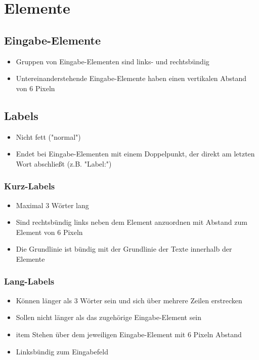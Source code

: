 \documentclass[12pt]{book}
\begin{document}
\section{Elemente}

\subsection{Eingabe-Elemente}

\begin{itemize}
\item Gruppen von Eingabe-Elementen sind links- und rechtsbündig
\item Untereinanderstehende Eingabe-Elemente haben einen vertikalen Abstand von 6 Pixeln
\end{itemize}


\subsection{Labels}

\begin{itemize}
\item Nicht fett ("normal")
\item Endet bei Eingabe-Elementen mit einem Doppelpunkt, der direkt am letzten Wort abschließt (z.B. "Label:")
\end{itemize}



\subsubsection{Kurz-Labels}
 
\begin{itemize}
\item Maximal 3 Wörter lang
\item Sind rechtsbündig links neben dem Element anzuordnen mit Abstand zum Element von 6 Pixeln
\item Die Grundlinie ist bündig mit der Grundlinie der Texte innerhalb der Elemente
\end{itemize}


\subsubsection{Lang-Labels}

\begin{itemize}
\item Können länger als 3 Wörter sein und sich über mehrere Zeilen erstrecken
\item Sollen nicht länger als das zugehörige Eingabe-Element sein
\item item Stehen über dem jeweiligen Eingabe-Element mit 6 Pixeln Abstand
\item Linksbündig zum Eingabefeld
\end{itemize}
\end{document}
